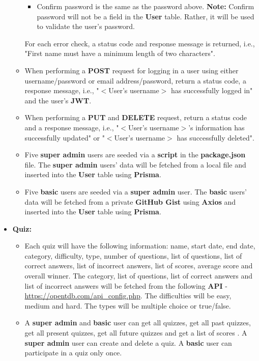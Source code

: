 \documentclass{article}
\begin{document}
\begin{itemize}
\begin{itemize}
\begin{itemize}
			\item Confirm password is the same as the password above. \textbf{Note:} Confirm password will not be a field in the \textbf{User} table. Rather, it will be used to validate the user's password.
		\end{itemize}
		For each error check, a status code and response message is returned, i.e., "First name must have a minimum length of two characters".
		\item When performing a \textbf{POST} request for logging in a user using either username/password or email address/password, return a status code, a response message, i.e., "$<$User's username$>$ has successfully logged in" and the user's \textbf{JWT}.
		\item When performing a \textbf{PUT} and \textbf{DELETE} request, return a status code and a response message, i.e., "$<$User's username$>$'s information has successfully updated" or "$<$User's username$>$ has successfully deleted".
		\item Five \textbf{super admin} users are seeded via a \textbf{script} in the \textbf{package.json} file. The \textbf{super admin} users' data will be fetched from a local file and inserted into the \textbf{User} table using \textbf{Prisma}.  
		\item Five \textbf{basic} users are seeded via a \textbf{super admin} user. The \textbf{basic} users' data will be fetched from a private \textbf{GitHub Gist} using \textbf{Axios} and inserted into the \textbf{User} table using \textbf{Prisma}. 
	\end{itemize} 
	\item \textbf{Quiz:}
	\begin{itemize}
		\item Each quiz will have the following information: name, start date, end date, category, difficulty, type, number of questions, list of questions, list of correct answers, list of incorrect answers, list of scores, average score and overall winner. The category, list of questions, list of correct answers and list of incorrect answers will be fetched from the following \textbf{API} - \href{https://opentdb.com/api\_config.php}{https://opentdb.com/api\_config.php}. The difficulties will be easy, medium and hard. The types will be multiple choice or true/false.
		\item A \textbf{super admin} and \textbf{basic} user can get all quizzes, get all past quizzes, get all present quizzes, get all future quizzes and get a list of scores . A \textbf{super admin} user can create and delete a quiz. A \textbf{basic} user can participate in a quiz only once.

\end{itemize}
\end{itemize}
\end{document}
